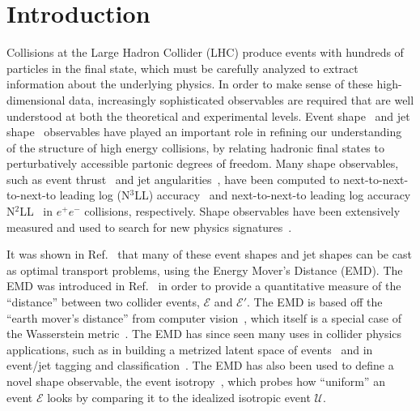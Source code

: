 \documentclass[letterpaper,11pt]{article}
\newcommand{\E}{\mathcal{E}}
\DeclareRobustCommand{\Refer}[1]{Ref.~\cite{#1}}
\begin{document}
\maketitle


\section{Introduction}

Collisions at the Large Hadron Collider (LHC) produce events with hundreds of particles in the final state, which must be carefully analyzed to extract information about the underlying physics.
%
In order to make sense of these high-dimensional data, increasingly sophisticated observables are required that are well understood at both  the theoretical and experimental levels.
%
Event shape~\cite{PhysRevLett.39.1587, Barber:1979bj, Dasgupta:2003iq, Dissertori:2008cn} and jet shape~\cite{Almeida:2008yp, Gur-Ari:2011cjr} observables have played an important role in refining our understanding of the structure of high energy collisions, by relating hadronic final states to perturbatively accessible partonic degrees of freedom.
%
Many shape observables, such as event thrust~\cite{BRANDT196457, PhysRevLett.39.1587, DERUJULA1978387} and jet angularities~\cite{ Berger:2003iw, Berger:2004xf}, have been computed to next-to-next-to-next-to leading log (N$^3$LL) accuracy~\cite{Becher:2008cf} and next-to-next-to leading log accuracy N$^2$LL~\cite{Banfi:2014sua} in $e^+e^-$ collisions, respectively.
%
Shape observables have been extensively measured and used to search for new physics signatures~\cite{Althoff:1983ew,Abrams:1989ez,Li:1989sn,Buskulic:1995aw,Adriani:1992gs, Braunschweig:1990yd,Abe:1994mf,Heister:2003aj,Abdallah:2003xz,Achard:2004sv, Abbiendi:2004qz, Abdesselam:2010pt}. 

It was shown in \Refer{2020} that many of these event shapes and jet shapes can be cast as optimal transport problems, using the Energy Mover's Distance (EMD).
%
The EMD was introduced in \Refer{Komiske_2019} in order to provide a quantitative measure of the ``distance'' between two collider events, $\mathcal{E}$ and $\mathcal{E}'$.
%
The EMD is based off the ``earth mover's distance'' from computer vision~\cite{192468, 10.5555/938978.939133, Rubner2004TheEM, Pele2008ALT, tangentEMD}, which itself is a special case of the Wasserstein metric~\cite{wasserstein1969markov, dobrushin1970prescribing}.
%
The EMD has since seen many uses in collider physics applications, such as in building a metrized latent space of events~\cite{Komiske_2019, Komiske:2019jim, Collins:2021pld, Park:2022zov} and in event/jet tagging and classification~\cite{CrispimRomao:2020ejk, Cai:2020vzx,Cai:2021hnn}.
%
The EMD has also been used to define a novel shape observable, the event isotropy~\cite{Cesarotti:2020hwb, Cesarotti_2021, ATLAS:2022jwu}, which probes how ``uniform'' an event $\E$ looks by comparing it to the idealized isotropic event $\mathcal{U}$.  
\end{document}
